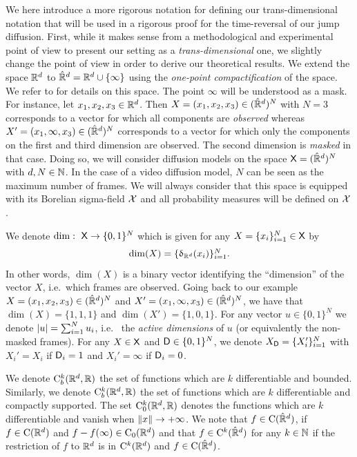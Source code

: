 We here introduce a more rigorous notation for defining our trans-dimensional notation that will be used in a rigorous proof for the time-reversal of our jump diffusion. First, while it makes sense from a methodological and experimental point of
view to present our setting as a \emph{trans-dimensional} one, we slightly change
the point of view in order to derive our theoretical results. We extend the
space $\mathbb{R}^d$ to $\hat{\mathbb{R}}^d = \mathbb{R}^d \cup \{\infty\}$ using the
\emph{one-point compactification} of the space. We refer to
\citet{kelley2017general} for details on this space. The point $\infty$ will be
understood as a mask. For instance, let $x_1, x_2, x_3 \in \mathbb{R}^d$. Then
$X = (x_1, x_2, x_3) \in (\hat{\mathbb{R}}^d)^N$ with $N=3$ corresponds to a vector
for which all components are \emph{observed} whereas
$X' = (x_1, \infty, x_3) \in (\hat{\mathbb{R}}^d)^N$ corresponds to a vector for
which only the components on the first and third dimension are observed. The
second dimension is \emph{masked} in that case. Doing so, we will consider
diffusion models on the space $\mathsf{X} = (\hat{\mathbb{R}}^d)^N$ with $d, N \in
\mathbb{N}$. In the case of a video diffusion model, $N$ can be seen as the maximum number of frames. We
will always consider that this space is equipped with its Borelian sigma-field
$\mathcal{X}$ and all probability measures will be defined on $\mathcal{X}$.

We denote $\mathrm{dim}: \ \mathsf{X} \to \{0,1\}^N$ which is given for any $X = \{x_i\}_{i=1}^N \in \mathsf{X}$ by
\begin{equation}
  \textstyle \mathrm{dim}(X) = \{\updelta_{\mathbb{R}^d}(x_i)\}_{i=1}^N . 
\end{equation}
In other words, $\dim(X)$ is a binary vector identifying the ``dimension'' of
the vector $X$, i.e.~which frames are observed. Going back to our example
$X = (x_1, x_2, x_3) \in (\hat{\mathbb{R}}^d)^N$ and
$X' = (x_1, \infty, x_3) \in (\hat{\mathbb{R}}^d)^N$, we have that
$\dim(X) = \{1,1,1\}$ and $\dim(X') = \{1, 0, 1\}$. For any vector
$u \in \{0,1\}^N$ we denote $|u| = \sum_{i=1}^N u_i$, i.e.~ the \emph{active
  dimensions} of $u$ (or equivalently the non-masked frames). For any
$X \in \mathsf{X}$ and $\mathsf{D} \in \{0, 1\}^N$, we denote $X_{\mathsf{D}} = \{X_i'\}_{i=1}^N$
with $X_i'=X_i$ if $\mathsf{D}_i=1$ and $X_i'=\infty$ if $\mathsf{D}_i=0$.

We denote $\mathrm{C}_b^k(\mathbb{R}^d, \mathbb{R})$ the set of functions which are $k$
differentiable and bounded. Similarly, we denote $\mathrm{C}_b^k(\mathbb{R}^d, \mathbb{R})$ the
set of functions which are $k$ differentiable and compactly supported. The set
$\mathrm{C}_0^k(\mathbb{R}^d, \mathbb{R})$ denotes the functions which are $k$ differentiable
and vanish when $\| x \| \to +\infty$.
We note that $f \in \mathrm{C}(\hat{\mathbb{R}}^d)$, if
$f \in \mathrm{C}(\mathbb{R}^d)$ and $f -f(\infty) \in \mathrm{C}_0(\mathbb{R}^d)$ and that
$f \in \mathrm{C}^k(\hat{\mathbb{R}}^d)$ for any $k \in \mathbb{N}$ if the restriction of $f$ to
$\mathbb{R}^d$ is in $\mathrm{C}^k(\mathbb{R}^d)$ and $f \in \mathrm{C}(\hat{\mathbb{R}}^d)$.

